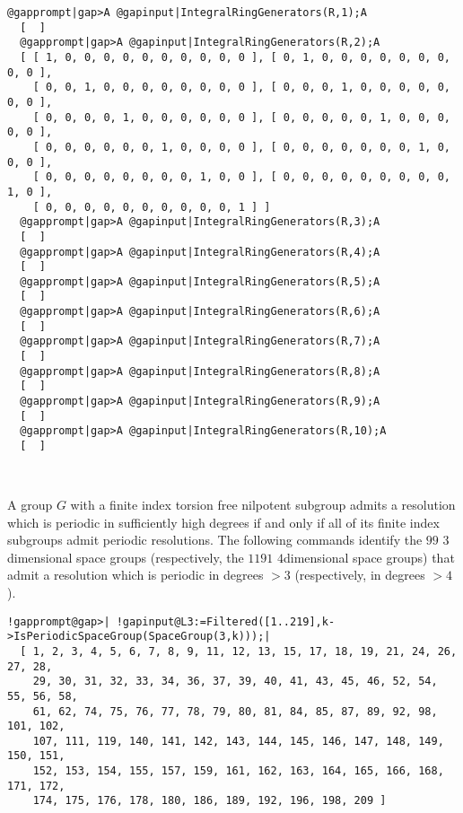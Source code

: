 \documentclass[a4paper,11pt]{report}
\begin{document}
{{\begin{Verbatim}[commandchars=@|A,fontsize=\small,frame=single,label=Example]
  @gapprompt|gap>A @gapinput|IntegralRingGenerators(R,1);A
  [  ]
  @gapprompt|gap>A @gapinput|IntegralRingGenerators(R,2);A
  [ [ 1, 0, 0, 0, 0, 0, 0, 0, 0, 0, 0 ], [ 0, 1, 0, 0, 0, 0, 0, 0, 0, 0, 0 ], 
    [ 0, 0, 1, 0, 0, 0, 0, 0, 0, 0, 0 ], [ 0, 0, 0, 1, 0, 0, 0, 0, 0, 0, 0 ], 
    [ 0, 0, 0, 0, 1, 0, 0, 0, 0, 0, 0 ], [ 0, 0, 0, 0, 0, 1, 0, 0, 0, 0, 0 ], 
    [ 0, 0, 0, 0, 0, 0, 1, 0, 0, 0, 0 ], [ 0, 0, 0, 0, 0, 0, 0, 1, 0, 0, 0 ], 
    [ 0, 0, 0, 0, 0, 0, 0, 0, 1, 0, 0 ], [ 0, 0, 0, 0, 0, 0, 0, 0, 0, 1, 0 ], 
    [ 0, 0, 0, 0, 0, 0, 0, 0, 0, 0, 1 ] ]
  @gapprompt|gap>A @gapinput|IntegralRingGenerators(R,3);A
  [  ]
  @gapprompt|gap>A @gapinput|IntegralRingGenerators(R,4);A
  [  ]
  @gapprompt|gap>A @gapinput|IntegralRingGenerators(R,5);A
  [  ]
  @gapprompt|gap>A @gapinput|IntegralRingGenerators(R,6);A
  [  ]
  @gapprompt|gap>A @gapinput|IntegralRingGenerators(R,7);A
  [  ]
  @gapprompt|gap>A @gapinput|IntegralRingGenerators(R,8);A
  [  ]
  @gapprompt|gap>A @gapinput|IntegralRingGenerators(R,9);A
  [  ]
  @gapprompt|gap>A @gapinput|IntegralRingGenerators(R,10);A
  [  ]
  
  
\end{Verbatim}
 

 A group $G$ with a finite index torsion free nilpotent subgroup admits a resolution which
is periodic in sufficiently high degrees if and only if all of its finite
index subgroups admit periodic resolutions. The following commands identify
the $99$ $3$\texttt{}dimensional space groups (respectively, the $1191$ $4$\texttt{}dimensional space groups) that admit a resolution which is
periodic in degrees $> 3$ (respectively, in degrees $> 4$). 
\begin{Verbatim}[commandchars=!@|,fontsize=\small,frame=single,label=Example]
  !gapprompt@gap>| !gapinput@L3:=Filtered([1..219],k->IsPeriodicSpaceGroup(SpaceGroup(3,k)));|
  [ 1, 2, 3, 4, 5, 6, 7, 8, 9, 11, 12, 13, 15, 17, 18, 19, 21, 24, 26, 27, 28, 
    29, 30, 31, 32, 33, 34, 36, 37, 39, 40, 41, 43, 45, 46, 52, 54, 55, 56, 58, 
    61, 62, 74, 75, 76, 77, 78, 79, 80, 81, 84, 85, 87, 89, 92, 98, 101, 102, 
    107, 111, 119, 140, 141, 142, 143, 144, 145, 146, 147, 148, 149, 150, 151, 
    152, 153, 154, 155, 157, 159, 161, 162, 163, 164, 165, 166, 168, 171, 172, 
    174, 175, 176, 178, 180, 186, 189, 192, 196, 198, 209 ] 
  

\end{Verbatim}}}
\end{document}
